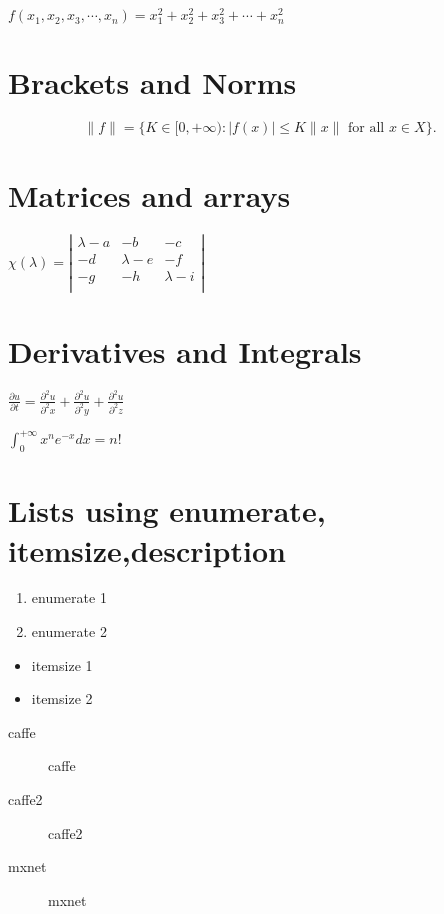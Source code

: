 \documentclass{beamer}
\begin{document}
$f(x_1,x_2,x_3,\cdots,x_n) = x_1^2 + x_2^2 + x_3^2 + \cdots + x_n^2$

\section{Brackets and Norms}

\[ \|f\| =  \{ K \in [0,+\infty) : |f(x)| \leq K\|x\| \mbox{ for all } x \in X \}. \] 

\section{Matrices and arrays}

$ \chi(\lambda) = 
\left| 
\begin{array}{ccc}
  \lambda - a  &  -b   & -c  \\ 
  - d          &  \lambda - e   & -f  \\ 
  - g  &  -h   & \lambda - i  \\ 
\end{array} 
\right| 
$

\section{Derivatives and Integrals}
$ 
\frac{\partial u}{\partial t} =
\frac{\partial^2 u}{\partial^2 x} + 
\frac{\partial^2 u}{\partial^2 y} + 
\frac{\partial^2 u}{\partial^2 z}  
$


$
\int_0^{+\infty} x^n  e^{-x} dx = n!
$

\section{Lists using enumerate, itemsize,description}

  \begin{enumerate}
  \item
    enumerate 1
  \item
    enumerate 2
  \end{enumerate}

  \begin{itemize}
  \item
    itemsize 1
  \item
    itemsize 2
  \end{itemize}

  \begin{description}
    \item[caffe]
      caffe
    \item[caffe2]
      caffe2
    \item[mxnet]
      mxnet 
  \end{description}
\end{document}
